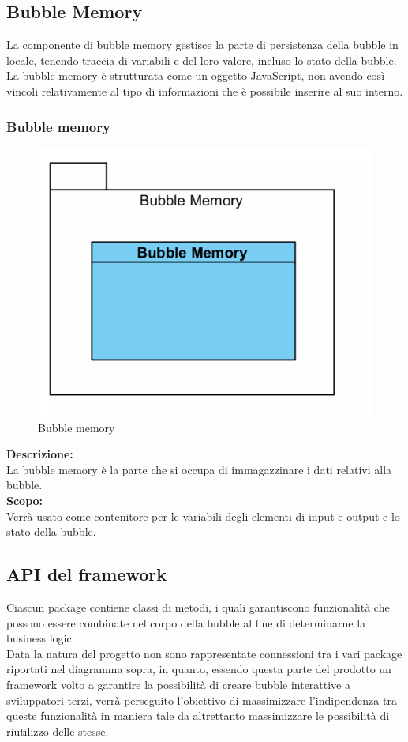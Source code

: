 \subsection{Bubble Memory}
La componente di bubble memory gestisce la parte di persistenza della bubble in locale, tenendo traccia di variabili e del loro valore, incluso lo stato della bubble. La bubble memory è strutturata come un oggetto JavaScript, non avendo così vincoli relativamente al tipo di informazioni che è possibile inserire al suo interno.

\begin{samepage}
\subsubsection{Bubble memory}\label{fm-memory}
\begin{figure}[H]
	\centering
	\includegraphics[width=14cm]{diagrammi_img/classi_e_package/bubble_memory.png}
	\caption{Bubble memory}
\end{figure}	
\end{samepage}
\textbf{Descrizione:}\\
La bubble memory è la parte che si occupa di immagazzinare i dati relativi alla bubble. \\
\textbf{Scopo:}\\
Verrà usato come contenitore per le variabili degli elementi di input e output e lo stato della bubble.

\subsection{API del framework}
Ciascun package contiene classi di metodi, i quali garantiscono funzionalità che possono essere combinate nel corpo della bubble al fine di determinarne la business logic.\\
Data la natura del progetto non sono rappresentate connessioni tra i vari package riportati nel diagramma sopra, in quanto, essendo questa parte del prodotto un framework volto a garantire la possibilità di creare bubble interattive a sviluppatori terzi, verrà perseguito l'obiettivo di massimizzare l'indipendenza tra queste funzionalità in maniera tale da altrettanto massimizzare le possibilità di riutilizzo delle stesse.

